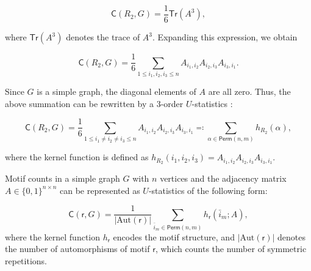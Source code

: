 \documentclass[twoside,11pt]{article}
\def\sfr{\mathsf{r}}
\newcommand{\perm}[1]{\mathsf{Perm}(#1)}
\newcommand{\motifrg}[2]{\mathsf{C}(#1,#2)}
\begin{document}
\begin{equation}
\label{equ:motif_triangle_1}
    \motifrg{R_2}{G} = \frac{1}{6} \mathsf{Tr}(A^3),
\end{equation}

where $\mathsf{Tr}(A^3)$ denotes the trace of $A^3$. Expanding this expression, we obtain

\begin{equation*}
    \motifrg{R_2}{G} = \frac{1}{6} \sum_{1 \le i_1,i_2,i_3 \le n } A_{i_1,i_2} A_{i_2,i_3} A_{i_3,i_1}.
\end{equation*}

Since $G$ is a simple graph, the diagonal elements of $A$ are all zero. Thus, the above summation can be rewritten by a $3$-order $U$-statistics :

\begin{equation*}
    \motifrg{R_2}{G} = \frac{1}{6} \sum_{1 \le i_1 \ne i_2 \ne i_3 \le n } A_{i_1,i_2} A_{i_2,i_3} A_{i_3,i_1}
    \eqqcolon \sum_{ \alpha \in \perm{n,m}} h_{R_2} ( \alpha ),
\end{equation*}

where the kernel function is defined as $h_{R_2}(i_1, i_2, i_3) = A_{i_1,i_2} A_{i_2,i_3} A_{i_3,i_1}$.
\fi

Motif counts in a simple graph $G$ with $n$ vertices and the adjacency matrix $A \in \{0,1\}^{n \times n}$ can be represented as $U$-statistics of the following form:

\begin{equation*}
\motifrg{\sfr}{G} = \frac{1}{|\mathrm{Aut}(\sfr)|} \sum_{ \bar{i}_{m} \in \perm{n,m}} h_{\sfr} (\bar{i}_{m}; A),
\end{equation*}
where the kernel function $h_{\sfr}$ encodes the motif structure, and $|\mathrm{Aut} (\sfr)|$ denotes the number of automorphisms of motif $\sfr$, which counts the number of symmetric repetitions.
\end{document}

